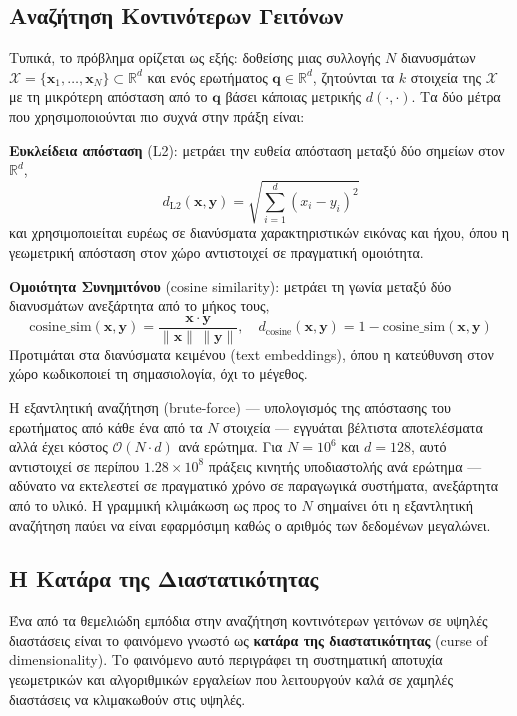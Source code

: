 \documentclass[12pt,a4paper]{article}
\begin{document}
\subsection{Αναζήτηση Κοντινότερων Γειτόνων}

Τυπικά, το πρόβλημα ορίζεται ως εξής: δοθείσης μιας συλλογής $N$ διανυσμάτων $\mathcal{X} = \{\mathbf{x}_1, \ldots, \mathbf{x}_N\} \subset \mathbb{R}^d$ και ενός ερωτήματος $\mathbf{q} \in \mathbb{R}^d$, ζητούνται τα $k$ στοιχεία της $\mathcal{X}$ με τη μικρότερη απόσταση από το $\mathbf{q}$ βάσει κάποιας μετρικής $d(\cdot, \cdot)$. Τα δύο μέτρα που χρησιμοποιούνται πιο συχνά στην πράξη είναι:

\textbf{Ευκλείδεια απόσταση} (L2): μετράει την ευθεία απόσταση μεταξύ δύο σημείων στον $\mathbb{R}^d$,
\[
d_{\text{L2}}(\mathbf{x},\mathbf{y})= \sqrt{\sum_{i=1}^{d}(x_i-y_i)^2}
\]
και χρησιμοποιείται ευρέως σε διανύσματα χαρακτηριστικών εικόνας και ήχου, όπου η γεωμετρική απόσταση στον χώρο αντιστοιχεί σε πραγματική ομοιότητα.

\textbf{Ομοιότητα Συνημιτόνου} (cosine similarity): μετράει τη γωνία μεταξύ δύο διανυσμάτων ανεξάρτητα από το μήκος τους,
\[
\text{cosine\_sim}(\mathbf{x},\mathbf{y}) = \frac{\mathbf{x}\cdot\mathbf{y}}{\|\mathbf{x}\|\,\|\mathbf{y}\|}, \quad
d_{\text{cosine}}(\mathbf{x},\mathbf{y}) = 1 - \text{cosine\_sim}(\mathbf{x},\mathbf{y})
\]
Προτιμάται στα διανύσματα κειμένου (text embeddings), όπου η κατεύθυνση στον χώρο κωδικοποιεί τη σημασιολογία, όχι το μέγεθος.

Η εξαντλητική αναζήτηση (brute-force) --- υπολογισμός της απόστασης του ερωτήματος από κάθε ένα από τα $N$ στοιχεία --- εγγυάται βέλτιστα αποτελέσματα αλλά έχει κόστος $\mathcal{O}(N \cdot d)$ ανά ερώτημα. Για $N = 10^6$ και $d = 128$, αυτό αντιστοιχεί σε περίπου $1.28 \times 10^8$ πράξεις κινητής υποδιαστολής ανά ερώτημα --- αδύνατο να εκτελεστεί σε πραγματικό χρόνο σε παραγωγικά συστήματα, ανεξάρτητα από το υλικό. Η γραμμική κλιμάκωση ως προς το $N$ σημαίνει ότι η εξαντλητική αναζήτηση παύει να είναι εφαρμόσιμη καθώς ο αριθμός των δεδομένων μεγαλώνει.

\subsection{Η Κατάρα της Διαστατικότητας}

Ένα από τα θεμελιώδη εμπόδια στην αναζήτηση κοντινότερων γειτόνων σε υψηλές διαστάσεις είναι το φαινόμενο γνωστό ως \textbf{κατάρα της διαστατικότητας} (curse of dimensionality). Το φαινόμενο αυτό περιγράφει τη συστηματική αποτυχία γεωμετρικών και αλγοριθμικών εργαλείων που λειτουργούν καλά σε χαμηλές διαστάσεις να κλιμακωθούν στις υψηλές.
\end{document}
